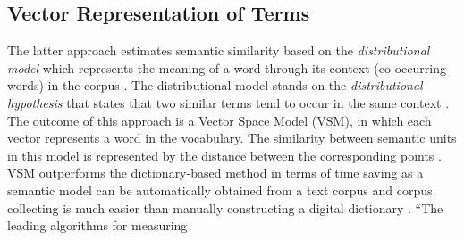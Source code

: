 \documentclass[Journal, BackFigs, DoubleSpace]{ascelike} %
\begin{document}
\subsection{Vector Representation of Terms}
\par
\par
The latter approach estimates semantic similarity based on the \textit{distributional model} which represents the meaning of a word through its context (co-occurring words) in the corpus \cite{erk12}. The distributional model stands on the \textit{distributional hypothesis} that states that two similar terms tend to occur in the same context \cite{Harris54}. The outcome of this approach is a Vector Space Model (VSM), in which each vector represents a word in the vocabulary. The similarity between semantic units in this model is represented by the distance between the corresponding points \cite{erk12}. VSM outperforms the dictionary-based method in terms of time saving as a semantic model can be automatically obtained from a text corpus and corpus collecting is much easier than manually constructing a digital dictionary \cite{turney10}. ``The leading algorithms for measuring
\end{document}
